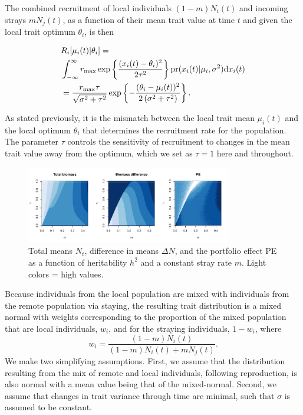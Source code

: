 \documentclass[twocolumn,preprintnumbers,amsmath,amssymb,superscriptaddress]{revtex4}
\begin{document}
The combined recruitment of local individuals $(1-m)N_i(t)$ and incoming strays $mN_j(t)$, as a function of their mean trait value at time $t$ and given the local trait optimum $\theta_i$, is then

\begin{align}
  &R_i[\mu_i(t)|\theta_i] = \\ \nonumber
  &\int_{-\infty}^\infty r_{\rm max}\exp\left\{\frac{(x_i(t)-\theta_i)^2}{2\tau^2}\right\} {\rm pr}(x_i(t)|\mu_i,\sigma^2) {\rm d}x_i(t) \\ \nonumber
  &= \frac{r_{\rm max} \tau  }{\sqrt{\sigma ^2+\tau ^2}}\exp\left\{-\frac{(\theta_i-\mu_i(t))^2}{2 \left(\sigma ^2+\tau ^2\right)}\right\}.
  \label{eq:R}
\end{align}

\noindent As stated previously, it is the mismatch between the local trait mean $\mu_i(t)$ and the local optimum $\theta_i$ that determines the recruitment rate for the population.
The parameter $\tau$ controls the sensitivity of recruitment to changes in the mean trait value away from the optimum, which we set as $\tau=1$ here and throughout.

\begin{figure}
\centering
\includegraphics[width=0.8\textwidth]{figs/fig_MDPE_hm.pdf}
\caption{
Total means $N_t$, difference in means $\Delta N$, and the portfolio effect PE as a function of heritability $h^2$ and a constant stray rate $m$. Light colors = high values.
} \label{fig:PE}
\end{figure}

Because individuals from the local population are mixed with individuals from the remote population via staying, the resulting trait distribution is a mixed normal with weights corresponding to the proportion of the mixed population that are local individuals, $w_i$, and for the straying individuals, $1-w_i$, where 
\begin{equation}
w_i=\frac{(1-m)N_i(t)}{(1-m) N_i(t) + m N_j(t)}.
\end{equation}
We make two simplifying assumptions.
First, we assume that the distribution resulting from the mix of remote and local individuals, following reproduction, is also normal with a mean value being that of the mixed-normal.
Second, we assume that changes in trait variance through time are minimal, such that $\sigma$ is assumed to be constant.
\end{document}
